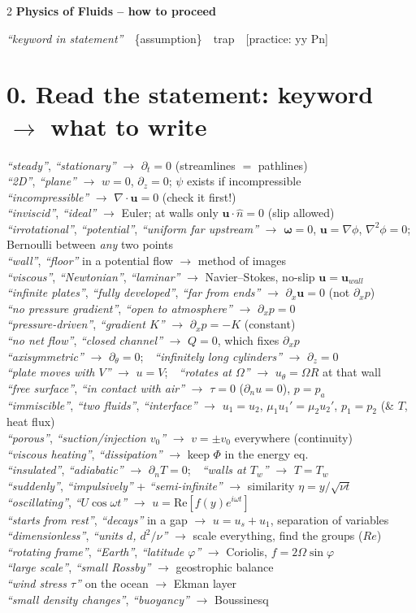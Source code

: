 \documentclass[8pt]{extarticle}
\newcommand{\nl}{\\[1.6pt]}
\newcommand{\bu}{\mathbf u}
\newcommand{\bo}{\boldsymbol\omega}
\newcommand{\pd}{\partial}
\newcommand{\wn}[1]{{\color{wn}#1}}
\newcommand{\ex}[1]{{\color{ex}\scriptsize[#1]}}
\newcommand{\as}[1]{{\color{gray}\{#1\}}}
\newcommand{\kw}[1]{{\color{kw}\itshape ``#1''}}
\begin{document}
\fontsize{7.6}{9.3}\selectfont
\begin{multicols*}{2}
\raggedcolumns
{\color{hd}\large\textbf{Physics of Fluids -- how to proceed}}\par
{\footnotesize \kw{keyword in statement}\ \ \as{assumption}\ \ \wn{trap}\ \ \ex{practice: yy Pn}}

\section{0. Read the statement: keyword $\to$ what to write}
\kw{steady}, \kw{stationary} $\to$ $\pd_t=0$ (streamlines $=$ pathlines)\nl
\kw{2D}, \kw{plane} $\to$ $w=0$, $\pd_z=0$; $\psi$ exists if incompressible\nl
\kw{incompressible} $\to$ $\nabla\!\cdot\bu=0$ (check it first!)\nl
\kw{inviscid}, \kw{ideal} $\to$ Euler; at walls only $\bu\cdot\hat n=0$ (slip allowed)\nl
\kw{irrotational}, \kw{potential}, \kw{uniform far upstream} $\to$ $\bo=0$, $\bu=\nabla\phi$, $\nabla^2\phi=0$; Bernoulli between \emph{any} two points\nl
\kw{wall}, \kw{floor} in a potential flow $\to$ method of images\nl
\kw{viscous}, \kw{Newtonian}, \kw{laminar} $\to$ Navier–Stokes, no-slip $\bu=\bu_{wall}$\nl
\kw{infinite plates}, \kw{fully developed}, \kw{far from ends} $\to$ $\pd_x\bu=0$ (\wn{not} $\pd_xp$)\nl
\kw{no pressure gradient}, \kw{open to atmosphere} $\to$ $\pd_xp=0$\nl
\kw{pressure-driven}, \kw{gradient $K$} $\to$ $\pd_xp=-K$ (constant)\nl
\kw{no net flow}, \kw{closed channel} $\to$ $Q=0$, which fixes $\pd_xp$\nl
\kw{axisymmetric} $\to$ $\pd_\theta=0$;\ \ \kw{infinitely long cylinders} $\to$ $\pd_z=0$\nl
\kw{plate moves with $V$} $\to$ $u=V$;\ \ \kw{rotates at $\Omega$} $\to$ $u_\theta=\Omega R$ at that wall\nl
\kw{free surface}, \kw{in contact with air} $\to$ $\tau=0$ ($\pd_nu=0$), $p=p_a$\nl
\kw{immiscible}, \kw{two fluids}, \kw{interface} $\to$ $u_1=u_2$, $\mu_1u_1'=\mu_2u_2'$, $p_1=p_2$ (\& $T$, heat flux)\nl
\kw{porous}, \kw{suction/injection $v_0$} $\to$ $v=\pm v_0$ everywhere (continuity)\nl
\kw{viscous heating}, \kw{dissipation} $\to$ keep $\Phi$ in the energy eq.\nl
\kw{insulated}, \kw{adiabatic} $\to$ $\pd_nT=0$;\ \ \kw{walls at $T_w$} $\to$ $T=T_w$\nl
\kw{suddenly}, \kw{impulsively} + \kw{semi-infinite} $\to$ similarity $\eta=y/\sqrt{\nu t}$\nl
\kw{oscillating}, \kw{$U\cos\omega t$} $\to$ $u=\mathrm{Re}[f(y)e^{i\omega t}]$\nl
\kw{starts from rest}, \kw{decays} in a gap $\to$ $u=u_s+u_1$, separation of variables\nl
\kw{dimensionless}, \kw{units $d$, $d^2/\nu$} $\to$ scale everything, find the groups ($Re$)\nl
\kw{rotating frame}, \kw{Earth}, \kw{latitude $\varphi$} $\to$ Coriolis, $f=2\Omega\sin\varphi$\nl
\kw{large scale}, \kw{small Rossby} $\to$ geostrophic balance\nl
\kw{wind stress $\tau$} on the ocean $\to$ Ekman layer\nl
\kw{small density changes}, \kw{buoyancy} $\to$ Boussinesq


\end{multicols*}
\end{document}
